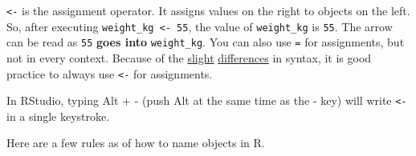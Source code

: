 \documentclass[
]{book}
\begin{document}
\texttt{\textless{}-} is the assignment operator. It assigns values on the right to objects on
the left. So, after executing \texttt{weight\_kg\ \textless{}-\ 55}, the value of \texttt{weight\_kg} is \texttt{55}. The arrow can
be read as \texttt{55} \textbf{goes into} \texttt{weight\_kg}. You can also use \texttt{=}
for assignments, but not in every context. Because of
the
\href{http://blog.revolutionanalytics.com/2008/12/use-equals-or-arrow-for-assignment.html}{slight} \href{https://web.archive.org/web/20130610005305/https://stat.ethz.ch/pipermail/r-help/2009-March/191462.html}{differences} in
syntax, it is good practice to always use \texttt{\textless{}-} for assignments.

In RStudio, typing Alt + - (push Alt at the
same time as the - key) will write \texttt{\textless{}-} in a single keystroke.

Here are a few rules as of how to name objects in R.
\end{document}

